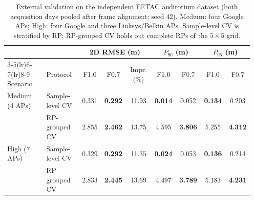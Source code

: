 \begin{table}[!t]
\centering
\caption{External validation on the independent EETAC auditorium dataset (both acquisition days pooled after frame alignment; seed 42). Medium: four Google APs; High: four Google and three Linksys/Belkin APs. Sample-level CV is stratified by RP; RP-grouped CV holds out complete RPs of the $5\times5$ grid.}
\label{tab:eetac_external}
\footnotesize
\setlength{\tabcolsep}{5pt}
\begin{tabular}{llccccccc}
\toprule
 & & \multicolumn{3}{c}{2D RMSE (m)} & \multicolumn{2}{c}{$P_{90}$ (m)} & \multicolumn{2}{c}{$P_{95}$ (m)} \\
\cmidrule(lr){3-5}\cmidrule(lr){6-7}\cmidrule(lr){8-9}
Scenario & Protocol & F1.0 & F0.7 & Impr. (\%) & F1.0 & F0.7 & F1.0 & F0.7 \\
\midrule
Medium (4 APs) & Sample-level CV & 0.331 & \textbf{0.292} & 11.93 & \textbf{0.014} & 0.052 & \textbf{0.134} & 0.203 \\
 & RP-grouped CV & 2.855 & \textbf{2.462} & 13.75 & 4.595 & \textbf{3.806} & 5.255 & \textbf{4.312} \\
\midrule
High (7 APs) & Sample-level CV & 0.329 & \textbf{0.292} & 11.35 & \textbf{0.024} & 0.053 & \textbf{0.136} & 0.214 \\
 & RP-grouped CV & 2.833 & \textbf{2.445} & 13.69 & 4.497 & \textbf{3.789} & 5.183 & \textbf{4.231} \\
\bottomrule
\end{tabular}
\end{table}

